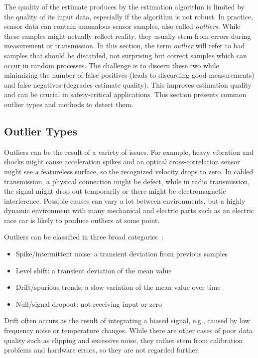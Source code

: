 The quality of the estimate produces by the estimation algorithm is limited by the quality of its input data, especially if the algorithm is not robust. In practice, sensor data can contain anomalous sensor samples, also called \textit{outliers}. While these samples might actually reflect reality, they usually stem from errors during measurement or transmission. In this section, the term \textit{outlier} will refer to bad samples that should be discarded, not surprising but correct samples which can occur in random processes. The challenge is to discern these two while minimizing the number of false positives (leads to discarding good measurements) and false negatives (degrades estimate quality). This improves estimation quality and can be crucial in safety-critical applications. This section presents common outlier types and methods to detect them.


\subsection{Outlier Types}
Outliers can be the result of a variety of issues. For example, heavy vibration and shocks might cause acceleration spikes and an optical cross-correlation sensor might see a featureless surface, so the recognized velocity drops to zero. In cabled transmission, a physical connection might be defect, while in radio transmission, the signal might drop out temporarily or there might be electromagnetic interference. Possible causes can vary a lot between environments, but a highly dynamic environment with many mechanical and electric parts such as an electric race car is likely to produce outliers at some point.

Outliers can be classified in three broad categories~\cites[p.~19]{Kabzan.2019}[p.~165~ff.]{Himmelblau.1994}:
\begin{itemize}
\item Spike/intermittent noise: a transient deviation from previous samples
\item Level shift: a transient deviation of the mean value
\item Drift/spurious trends: a slow variation of the mean value over time
\item Null/signal dropout: not receiving input or zero
\end{itemize}
Drift often occurs as the result of integrating a biased signal, e.g., caused by low frequency noise or temperature changes. While there are other cases of poor data quality such as clipping and excessive noise, they rather stem from calibration problems and hardware errors, so they are not regarded further.

